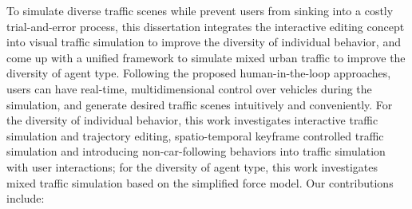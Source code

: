 To simulate diverse traffic scenes while prevent users from sinking into a costly trial-and-error process, this dissertation integrates the interactive editing concept into visual traffic simulation to improve the diversity of individual behavior, and come up with a unified framework to simulate mixed urban traffic to improve the diversity of agent type. Following the proposed human-in-the-loop approaches, users can have real-time, multidimensional control over vehicles during the simulation, and generate desired traffic scenes intuitively and conveniently. For the diversity of individual behavior, this work investigates interactive traffic simulation and trajectory editing, spatio-temporal keyframe controlled traffic simulation and introducing non-car-following behaviors into traffic simulation with user interactions; for the diversity of agent type, this work investigates mixed traffic simulation based on the simplified force model. Our contributions include:  


